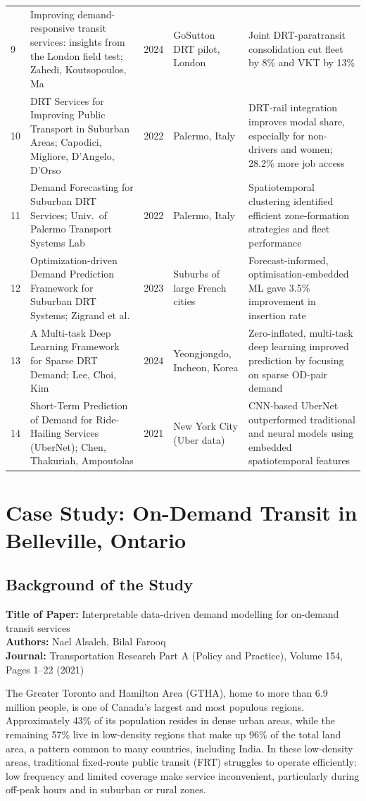 \documentclass[12pt]{article}
\begin{document}
\begin{longtable}{p{0.4cm}p{4.8cm}p{0.6cm}p{2.7cm}p{4.7cm}}
9 & Improving demand-responsive transit services: insights from the London field test; Zahedi, Koutsopoulos, Ma & 2024 & GoSutton DRT pilot, London & Joint DRT-paratransit consolidation cut fleet by 8\% and VKT by 13\% \\
10 & DRT Services for Improving Public Transport in Suburban Areas; Capodici, Migliore, D'Angelo, D'Orso & 2022 & Palermo, Italy & DRT-rail integration improves modal share, especially for non-drivers and women; 28.2\% more job access \\
11 & Demand Forecasting for Suburban DRT Services; Univ.\ of Palermo Transport Systems Lab & 2022 & Palermo, Italy & Spatiotemporal clustering identified efficient zone-formation strategies and fleet performance \\
12 & Optimization-driven Demand Prediction Framework for Suburban DRT Systems; Zigrand et al. & 2023 & Suburbs of large French cities & Forecast-informed, optimisation-embedded ML gave 3.5\% improvement in insertion rate \\
13 & A Multi-task Deep Learning Framework for Sparse DRT Demand; Lee, Choi, Kim & 2024 & Yeongjongdo, Incheon, Korea & Zero-inflated, multi-task deep learning improved prediction by focusing on sparse OD-pair demand \\
14 & Short-Term Prediction of Demand for Ride-Hailing Services (UberNet); Chen, Thakuriah, Ampoutolas & 2021 & New York City (Uber data) & CNN-based UberNet outperformed traditional and neural models using embedded spatiotemporal features \\
\end{longtable}
\normalsize

\section{Case Study: On-Demand Transit in Belleville, Ontario}

\subsection{Background of the Study}

\textbf{Title of Paper:} Interpretable data-driven demand modelling for on-demand
transit services\\
\textbf{Authors:} Nael Alsaleh, Bilal Farooq\\
\textbf{Journal:} Transportation Research Part A (Policy and Practice), Volume 154,
Pages 1--22 (2021)

The Greater Toronto and Hamilton Area (GTHA), home to more than 6.9 million people,
is one of Canada's largest and most populous regions. Approximately 43\% of its
population resides in dense urban areas, while the remaining 57\% live in
low-density regions that make up 96\% of the total land area, a pattern common to
many countries, including India. In these low-density areas, traditional
fixed-route public transit (FRT) struggles to operate efficiently: low frequency and
limited coverage make service inconvenient, particularly during off-peak hours and
in suburban or rural zones.
\end{document}
